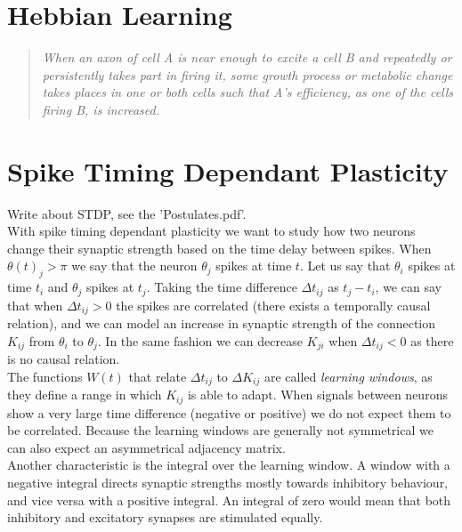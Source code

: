 


\mainmatter

\section{Hebbian Learning}
\vspace{1mm}
\begin{quote}
\textsl{When an axon of cell A is near enough to excite a cell B and repeatedly or persistently takes part in firing it, some growth process or metabolic change takes places in one or both cells such that A's efficiency, as one of the cells firing B, is increased.}\cite{Hebb1949}
\end{quote}

\section{Spike Timing Dependant Plasticity}
Write about STDP, see the 'Postulates.pdf'. \\

With spike timing dependant plasticity we want to study how two neurons change their synaptic strength based on the time delay between spikes. When $\theta(t)_j > \pi$ we say that the neuron $\theta_j$ spikes at time $t$. 
Let us say that $\theta_i$ spikes at time $t_i$ and $\theta_j$ spikes at $t_j$. Taking the time difference $\Delta t_{ij}$ as $t_j - t_i$, we can say that when $\Delta t_{ij} > 0$ the spikes are correlated (there exists a temporally causal relation), and we can model an increase in synaptic strength of the connection $K_{ij}$ from $\theta_i$ to $\theta_j$. In the same fashion we can decrease $K_{ji}$ when $\Delta t_{ij} < 0$ as there is no causal relation. \\
The functions $W(t)$ that relate $\Delta t_{ij}$ to $\Delta K_{ij}$ are called \textsl{learning windows},  as they define a range in which $K_{ij}$ is able to adapt. When signals between neurons show a very large time difference (negative or positive) we do not expect them to be correlated. Because the learning windows are generally not symmetrical we can also expect an asymmetrical adjacency matrix.\\
Another characteristic is the integral over the learning window. A window with a negative integral directs synaptic strengths mostly towards inhibitory behaviour, and vice versa with a positive integral. An integral of zero would mean that both inhibitory and excitatory synapses are stimulated equally.\\

